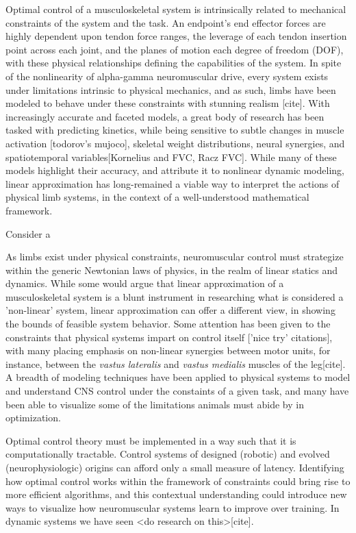 Optimal control of a musculoskeletal system is intrinsically related to mechanical constraints of the system and the task. 
An endpoint's end effector forces are highly dependent upon tendon force ranges, the leverage of each tendon insertion point across each joint, and the planes of motion each degree of freedom (DOF), with these physical relationships defining the capabilities of the system.
In spite of the nonlinearity of alpha-gamma neuromuscular drive, every system exists under limitations intrinsic to physical mechanics, and as such, limbs have been modeled to behave under these constraints with stunning realism [cite]. With increasingly accurate and faceted models, a great body of research has been tasked with predicting kinetics, while being sensitive to subtle changes in muscle activation [todorov's mujoco], skeletal weight distributions, neural synergies, and spatiotemporal variables[Kornelius and FVC, Racz FVC].
While many of these models highlight their accuracy, and attribute it to nonlinear dynamic modeling, linear approximation has long-remained a viable way to interpret the actions of physical limb systems, in the context of a well-understood mathematical framework.

Consider a 

As limbs exist under physical constraints, neuromuscular control must strategize within the generic Newtonian laws of physics, in the realm of linear statics and dynamics.
While some would argue that linear approximation of a musculoskeletal system is a blunt instrument in researching what is considered a 'non-linear' system, linear approximation can offer a different view, in showing the bounds of feasible system behavior.
Some attention has been given to the constraints that physical systems impart on control itself ['nice try' citations], with many placing emphasis on non-linear synergies between motor units, for instance, between the \textit{vastus lateralis} and \textit{vastus medialis} muscles of the leg[cite].
A breadth of modeling techniques have been applied to physical systems to model and understand CNS control under the constaints of a given task, and many have been able to visualize some of the limitations animals must abide by in optimization.

Optimal control theory must be implemented in a way such that it is computationally tractable. Control systems of designed (robotic) and evolved (neurophysiologic) origins can afford only a small measure of latency.
Identifying how optimal control works within the framework of constraints could bring rise to more efficient algorithms, and this contextual understanding could introduce new ways to visualize how neuromuscular systems learn to improve over training.
In dynamic systems we have seen <do research on this>[cite].

